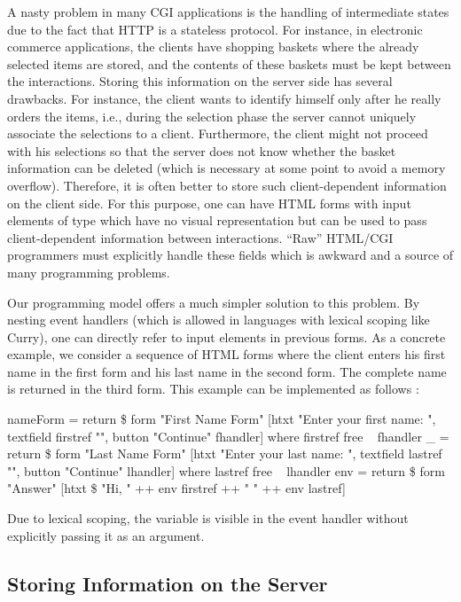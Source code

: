 A nasty problem in many CGI applications is the handling
of intermediate states due to the fact that HTTP is a stateless
protocol. For instance, in electronic commerce applications,
the clients have shopping baskets where
the already selected items are stored, and the contents of
these baskets must be kept between the interactions.
Storing this information on the server side
has several drawbacks. For instance, the client
wants to identify himself only after he really orders
the items, i.e., during the selection phase the server
cannot uniquely associate the selections to a client.
Furthermore, the client might not proceed with his selections
so that the server does not know whether
the basket information can be deleted (which is necessary
at some point to avoid a memory overflow).
Therefore, it is often better to store such client-dependent
information on the client side. For this purpose,
one can have HTML forms with input elements of type 
which have no visual representation but can be used
to pass client-dependent information between interactions.
``Raw'' HTML/CGI programmers must explicitly handle
these fields which is awkward and a source of many
programming problems.

Our programming model offers a much simpler solution
to this problem. By nesting event handlers
(which is allowed in languages with lexical scoping like Curry),
one can directly refer to input elements in previous forms.
As a concrete example, we consider
a sequence of HTML forms where the client enters
his first name in the first form and his last name in the second form.
The complete name is returned in the third form.
This example can be implemented as follows
:
%
\begin{prog}
nameForm = return \$ form "First Name Form"
  [htxt "Enter your first name: ", textfield firstref "",
   button "Continue" fhandler]
 where
   firstref free
~
   fhandler _ = return \$ form "Last Name Form"
                  [htxt "Enter your last name: ", textfield lastref "",
                   button "Continue" lhandler]
     where
       lastref free
~
       lhandler env = return \$ form "Answer"
                        [htxt \$ "Hi, " ++ env firstref ++ " " ++ env lastref]
\end{prog}
%
Due to lexical scoping, the variable 
is visible in the event handler  without explicitly
passing it as an argument.


\subsection{Storing Information on the Server}

